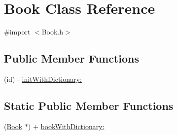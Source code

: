 \hypertarget{interface_book}{
\section{Book Class Reference}
\label{interface_book}
}


{\ttfamily \#import $<$Book.h$>$}

\subsection*{Public Member Functions}
\begin{DoxyCompactItemize}
\item 
(id) -\/ \hyperlink{interface_book_ae4056227c171b77998bee34a1d9c02ee}{initWithDictionary:}
\end{DoxyCompactItemize}
\subsection*{Static Public Member Functions}
\begin{DoxyCompactItemize}
\item 
(\hyperlink{interface_book}{Book} $\ast$) + \hyperlink{interface_book_aba5b6b3d032db273752813c8411627db}{bookWithDictionary:}
\end{DoxyCompactItemize}
